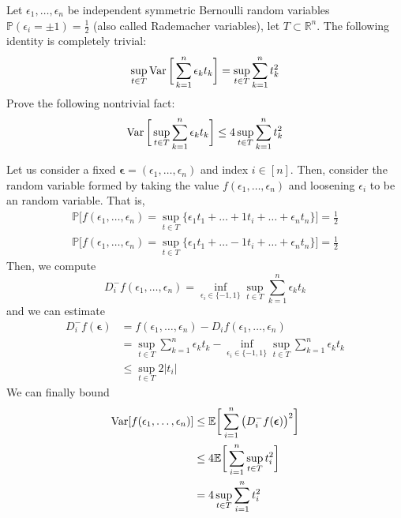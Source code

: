   \begin{exercise}
  Let $\epsilon_1, \ldots, \epsilon_n$ be independent symmetric Bernoulli random variables $\mathbb{P}(\epsilon_i = \pm 1) = \frac{1}{2}$ (also called Rademacher variables), let $T \subset \mathbb{R}^n$. The following identity is completely trivial: 
  \[\sup_{t \in T} \operatorname{Var} \bigg[ \sum_{k=1}^n \epsilon_k t_k \bigg] = \sup_{t \in T} \sum_{k=1}^n t_k^2\]
  Prove the following nontrivial fact: 
  \[\operatorname{Var} \bigg[ \sup_{t \in T} \sum_{k=1}^n \epsilon_k t_k \bigg] \leq 4 \sup_{t \in T} \sum_{k=1}^n t_k^2\]
  \end{exercise}
  \begin{solution}
  Let us consider a fixed $\boldsymbol{\epsilon} = (\epsilon_1, \ldots, \epsilon_n)$ and index $i \in [n]$. Then, consider the random variable formed by taking the value $f(\epsilon_1, \ldots, \epsilon_n)$ and loosening $\epsilon_i$ to be an random variable. That is, 
  \begin{align*}
      \mathbb{P} \Big[ f(\epsilon_1, \ldots, \epsilon_n) = \sup_{t \in T} \{\epsilon_1 t_1 + \ldots + 1 t_i + \ldots + \epsilon_n t_n\} \Big] = \frac{1}{2} \\
      \mathbb{P} \Big[ f(\epsilon_1, \ldots, \epsilon_n) = \sup_{t \in T} \{\epsilon_1 t_1 + \ldots - 1 t_i + \ldots + \epsilon_n t_n\} \Big] = \frac{1}{2} 
  \end{align*}
  Then, we compute 
  \[D_i^- f (\epsilon_1, \ldots, \epsilon_n) = \inf_{\epsilon_i \in \{-1, 1\}} \sup_{t \in T} \sum_{k=1}^n \epsilon_k t_k\]
  and we can estimate 
  \begin{align*}
      D_i^- f(\boldsymbol{\epsilon}) & = f(\epsilon_1, \ldots, \epsilon_n) - D_i f (\epsilon_1, \ldots, \epsilon_n) \\
      & = \sup_{t \in T} \sum_{k=1}^n \epsilon_k t_k - \inf_{\epsilon_i \in \{-1, 1\}} \sup_{t \in T} \sum_{k=1}^n \epsilon_k t_k \\
      & \leq \sup_{t \in T} 2 |t_i| 
  \end{align*}
  We can finally bound 
  \begin{align*}
      \operatorname{Var}[ f(\epsilon_1, \ldots, \epsilon_n)] & \leq \mathbb{E} \bigg[ \sum_{i=1}^n \big( D_i^- f(\boldsymbol{\epsilon})\big)^2 \bigg] \\
      & \leq 4 \mathbb{E} \bigg[ \sum_{i=1}^n \sup_{t \in T} t_i^2 \bigg] \\
      & = 4 \sup_{t \in T} \sum_{i=1}^n t_i^2 
  \end{align*}
  \end{solution}

